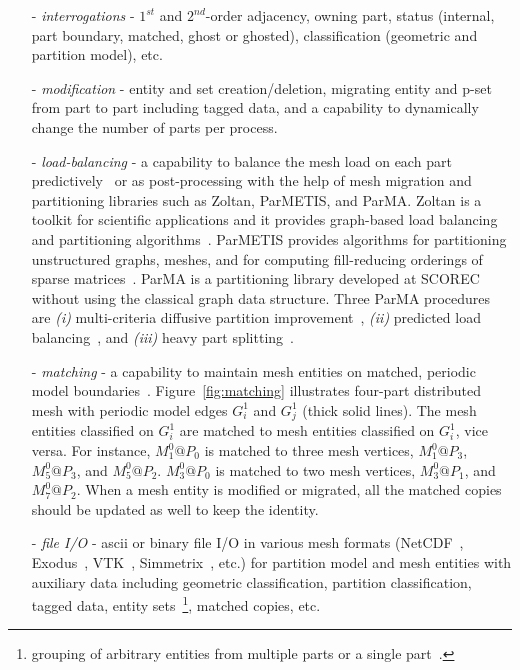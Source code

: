 \begin{enumerate}
\item[-] \emph{interrogations} - $1^{st}$ and $2^{nd}$-order adjacency,
 owning part, status (internal, part boundary, matched, 
ghost or ghosted), classification (geometric and partition model), etc.
\item[-] \emph{modification} - entity and set creation/deletion, migrating 
entity and p-set from part to part including tagged data, 
and a capability to dynamically change the number of parts per process.
\item[-] \emph{load-balancing} -  a capability 
to balance the mesh load on each part predictively~\cite{predictive97,zhou12} or 
as post-processing with the help of mesh migration and partitioning libraries 
such as Zoltan, ParMETIS, and ParMA. Zoltan is a toolkit for scientific 
applications and it provides
graph-based load balancing and partitioning algorithms~\cite{zoltanweb}.
ParMETIS provides algorithms for partitioning unstructured graphs, meshes, and 
for computing fill-reducing orderings of sparse matrices~\cite{parmetisweb}.
ParMA is a partitioning library developed at SCOREC without using
 the classical graph data structure. Three ParMA procedures are \emph{(i)} multi-criteria 
diffusive partition improvement~\cite{zhou-contr,zhou-extr}, 
\emph{(ii)} predicted load balancing~\cite{predictive97,zhou12}, 
and \emph{(iii)} heavy part splitting~\cite{zhou12,pumi12}. 

\item[-] \emph{matching} - a capability to maintain mesh entities on matched, 
periodic model boundaries~\cite{matching07,meshsimmatchingweb}. 
Figure~\ref{fig:matching} illustrates four-part distributed mesh with periodic 
model edges $G^1_i$ and $G^1_j$ (thick solid lines). The mesh entities 
classified on $G^1_i$ are matched to mesh entities classified on $G^1_i$, vice 
versa. For instance, $M^0_1@P_0$ is matched to three mesh vertices, $M^0_1@P_3$, 
$M^0_5@P_3$, and $M^0_5@P_2$. $M^0_3@P_0$ is matched to two mesh vertices, 
$M^0_3@P_1$, and $M^0_7@P_2$. When a mesh entity is modified or migrated, all 
the matched copies should be updated as well to keep the identity.
\item[-] \emph{file I/O} - ascii or binary file I/O in various mesh formats 
(NetCDF~\cite{netcdfweb}, Exodus~\cite{exodusreport94}, VTK~\cite{vtkweb}, 
Simmetrix~\cite{simmetrixweb}, etc.) for partition model and mesh entities with 
auxiliary data including geometric classification, partition classification, 
tagged data, entity sets~\footnote{grouping of arbitrary entities from multiple 
parts or a single part~\cite{moabreport04,imesh10,itapsweb}.}, matched copies, etc.
\end{enumerate}

